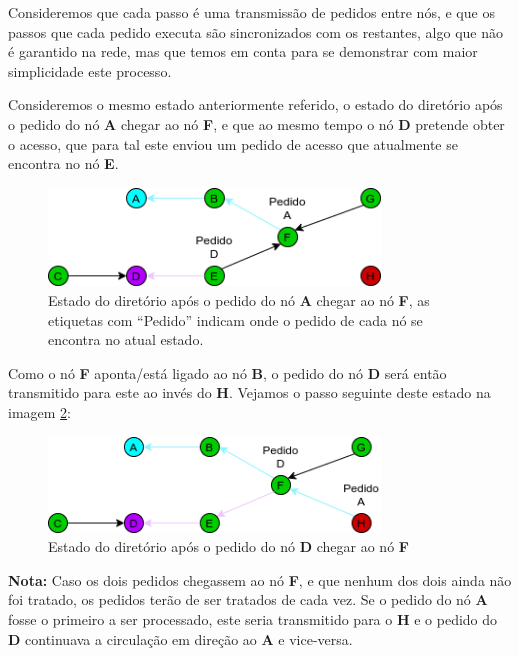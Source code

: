 Consideremos que cada passo é uma transmissão de pedidos entre nós, e que os passos que cada pedido executa são sincronizados com os restantes, algo que não é garantido na rede, mas que temos em conta para se demonstrar com maior simplicidade este processo.

Consideremos o mesmo estado anteriormente referido, o estado do diretório após o pedido do nó \textbf{A} chegar ao nó \textbf{F}, e que ao mesmo tempo o nó \textbf{D} pretende obter o acesso, que para tal este enviou um pedido de acesso que atualmente se encontra no nó \textbf{E}.


\begin{figure}[!htb]
\centering
\includegraphics[width=250pt]{dois_pedidos_1.png}
\caption{Estado do diretório após o pedido do nó \textbf{A} chegar ao nó \textbf{F}, as etiquetas com ``Pedido'' indicam onde o pedido de cada nó se encontra no atual estado.}
\label{motivacao:img:apos_chegar_f_etiquetas}
\end{figure}

Como o nó \textbf{F} aponta/está ligado ao nó \textbf{B}, o pedido do nó \textbf{D} será então transmitido para este ao invés do \textbf{H}.
Vejamos o passo seguinte deste estado na imagem \ref{motivacao:img:d_chega_f}:


\begin{figure}[!htb]
\centering
\includegraphics[width=250pt]{dois_pedidos_2.png}
\caption{Estado do diretório após o pedido do nó \textbf{D} chegar ao nó \textbf{F}}
\label{motivacao:img:d_chega_f}
\end{figure}

\textbf{Nota:} Caso os dois pedidos chegassem ao nó \textbf{F}, e que nenhum dos dois ainda não foi tratado, os pedidos terão de ser tratados de cada vez. Se o pedido do nó \textbf{A} fosse o primeiro a ser processado, este seria transmitido para o \textbf{H} e o pedido do \textbf{D} continuava a circulação em direção ao \textbf{A} e vice-versa. \\

